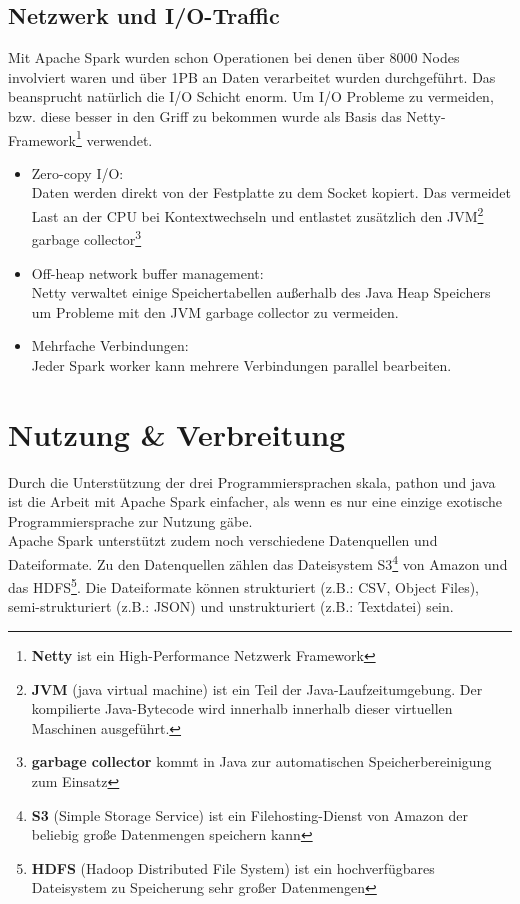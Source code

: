 \subsection{Netzwerk und I/O-Traffic}

Mit Apache Spark wurden schon Operationen bei denen über 8000 Nodes involviert waren und über 1PB an Daten verarbeitet wurden durchgeführt.
Das beansprucht natürlich die I/O Schicht enorm.
Um I/O Probleme zu vermeiden, bzw. diese besser in den Griff zu bekommen wurde als Basis das Netty-Framework\footnote{\textbf{Netty} ist ein High-Performance Netzwerk Framework} verwendet.
\begin{itemize}
	\item Zero-copy I/O:\\
	Daten werden direkt von der Festplatte zu dem Socket kopiert. Das vermeidet Last an der CPU bei Kontextwechseln und entlastet zusätzlich den JVM\footnote{\textbf{JVM} (java virtual machine) ist ein Teil der Java-Laufzeitumgebung. Der kompilierte Java-Bytecode wird innerhalb innerhalb dieser virtuellen Maschinen ausgeführt.} garbage collector\footnote{\textbf{garbage collector} kommt in Java zur automatischen Speicherbereinigung zum Einsatz}
	\item Off-heap network buffer management:\\
	Netty verwaltet einige Speichertabellen außerhalb des Java Heap Speichers um Probleme mit den JVM garbage collector zu vermeiden.
	\item Mehrfache Verbindungen:\\
	Jeder Spark worker kann mehrere Verbindungen parallel bearbeiten.
\end{itemize}


\section{Nutzung \& Verbreitung}

Durch die Unterstützung der drei Programmiersprachen skala, pathon und java ist die Arbeit mit Apache Spark einfacher, als wenn es nur eine einzige exotische Programmiersprache zur Nutzung gäbe. \\

\noindent
Apache Spark unterstützt zudem noch verschiedene Datenquellen und Dateiformate.  Zu den Datenquellen zählen das Dateisystem S3\footnote{\textbf{S3} (Simple Storage Service) ist ein Filehosting-Dienst von Amazon der beliebig große Datenmengen speichern kann} von Amazon und das HDFS\footnote{\textbf{HDFS} (Hadoop Distributed File System) ist ein hochverfügbares Dateisystem zu Speicherung sehr großer Datenmengen}.
Die Dateiformate können strukturiert (z.B.: CSV, Object Files), semi-strukturiert (z.B.: JSON) und unstrukturiert (z.B.: Textdatei) sein.\\


